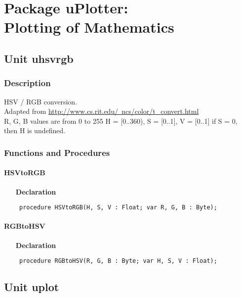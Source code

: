 \documentclass[12pt,a4paper,oneside]{report}
\newcommand{\declarationitem}[1]{\textbf{#1}}
\newcommand{\code}[1]{\texttt{#1}}
\begin{document}
\chapter{Package uPlotter: \\ Plotting of Mathematics}\label{package-uplotter}
\section{Unit uhsvrgb}
\label{uhsvrgb}
\subsection{Description}
HSV / RGB conversion. \\ 
Adapted from \href{http://www.cs.rit.edu/~ncs/color/t_convert.html}{http://www.cs.rit.edu/~ncs/color/t{\_}convert.html} \\ R, G, B values are from 0 to 255 H = [0..360), S = [0..1], V = [0..1] if S = 0, then H is undefined. \subsection{Functions and Procedures}
\subsubsection{HSVtoRGB}
\label{uhsvrgb-HSVtoRGB}
\begin{itemize}\item[\declarationitem{Declaration}\hfill]
	\begin{flushleft}
		\code{
			procedure HSVtoRGB(H, S, V : Float; var R, G, B : Byte);}
		
	\end{flushleft}
	
\end{itemize}
\subsubsection{RGBtoHSV}
\label{uhsvrgb-RGBtoHSV}
\begin{itemize}\item[\declarationitem{Declaration}\hfill]
	\begin{flushleft}
		\code{
			procedure RGBtoHSV(R, G, B : Byte; var H, S, V : Float);}
		
	\end{flushleft}
	
\end{itemize}
\section{Unit uplot}
\label{uplot}
\end{document}
